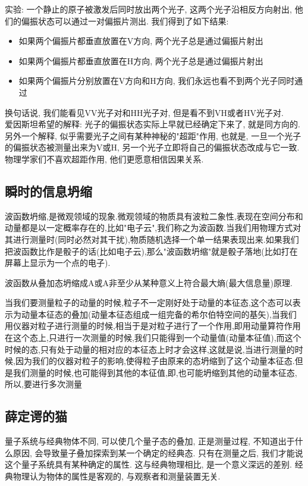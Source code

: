 \documentclass[openany]{book}
\begin{document}
实验: 一个静止的原子被激发后同时放出两个光子, 这两个光子沿相反方向射出, 他们的偏振状态可以通过一对偏振片测出. 我们得到了如下结果:
\begin{itemize}
	\item 如果两个偏振片都垂直放置在V方向, 两个光子总是通过偏振片射出
	\item 如果两个偏振片都垂直放置在H方向, 两个光子总是通过偏振片射出
	\item 如果两个偏振片分别放置在V方向和H方向, 我们永远也看不到两个光子同时通过
\end{itemize}
换句话说, 我们能看见VV光子对和HH光子对, 但是看不到VH或者HV光子对.\\
爱因斯坦希望的解释: 光子的偏振状态实际上早就已经确定下来了, 就是同方向的.\\
另外一个解释, 似乎需要光子之间有某种神秘的"超距"作用, 也就是, 一旦一个光子的偏振状态被测量出来为V或H, 另一个光子立即将自己的偏振状态改成与它一致.\\
物理学家们不喜欢超距作用, 他们更愿意相信因果关系.

\subsection{瞬时的信息坍缩}
波函数坍缩,是微观领域的现象.微观领域的物质具有波粒二象性,表现在空间分布和动量都是以一定概率存在的,比如"电子云",我们称之为波函数.当我们用物理方式对其进行测量时(同时必然对其干扰),物质随机选择一个单一结果表现出来.如果我们把波函数比作是骰子的话(比如电子云),那么"波函数坍缩"就是骰子落地(比如打在屏幕上显示为一个点的电子).\par
波函数从叠加态坍缩成A或A非至少从某种意义上符合最大熵(最大信息量)原理.\par
当我们要测量粒子的动量的时候,粒子不一定刚好处于动量的本征态,这个态可以表示为动量本征态的叠加(动量本征态组成一组完备的希尔伯特空间的基矢),当我们用仪器对粒子进行测量的时候,相当于是对粒子进行了一个作用,即用动量算符作用在这个态上,只进行一次测量的时候,我们只能得到一个动量值(动量本征值),而这个时候的态,只有处于动量的相对应的本征态上时才会这样,这就是说,当进行测量的时候,因为我们的仪器对粒子的影响,使得粒子由原来的态坍缩到了这个动量本征态.但是我们测量的时候,也可能得到其他的本征值,即,也可能坍缩到其他的动量本征态,所以,要进行多次测量

\subsection{薛定谔的猫}
量子系统与经典物体不同, 可以使几个量子态的叠加, 正是测量过程, 不知道出于什么原因, 会导致量子叠加探索到某一个确定的经典态. 
只有在测量之后, 我们才能说这个量子系统具有某种确定的属性. 
这与经典物理相比, 是一个意义深远的差别. 经典物理认为物体的属性是客观的, 与观察者和测量装置无关.
\end{document}
